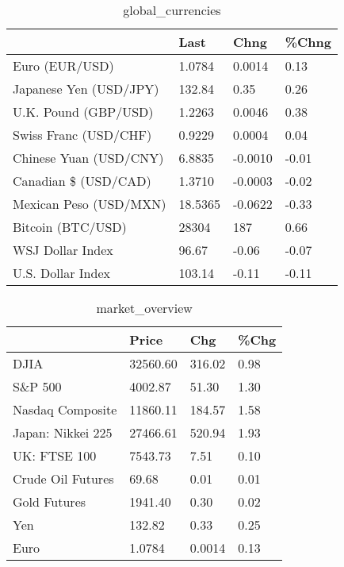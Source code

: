 \documentclass{article}%
\begin{document}
%


\begin{table}[htbp]%
\caption{global\_currencies}%
\centering%
\begin{adjustbox}{width=1\textwidth}%
\begin{tabular}{llll}
\toprule
                       &    Last &    Chng & \%Chng \\
\midrule
        Euro (EUR/USD) &  1.0784 &  0.0014 &  0.13 \\
Japanese Yen (USD/JPY) &  132.84 &    0.35 &  0.26 \\
  U.K. Pound (GBP/USD) &  1.2263 &  0.0046 &  0.38 \\
 Swiss Franc (USD/CHF) &  0.9229 &  0.0004 &  0.04 \\
Chinese Yuan (USD/CNY) &  6.8835 & -0.0010 & -0.01 \\
  Canadian \$ (USD/CAD) &  1.3710 & -0.0003 & -0.02 \\
Mexican Peso (USD/MXN) & 18.5365 & -0.0622 & -0.33 \\
     Bitcoin (BTC/USD) &   28304 &     187 &  0.66 \\
      WSJ Dollar Index &   96.67 &   -0.06 & -0.07 \\
     U.S. Dollar Index &  103.14 &   -0.11 & -0.11 \\
\bottomrule
\end{tabular}
%
\end{adjustbox}%
\end{table}

%


\begin{table}[htbp]%
\caption{market\_overview}%
\centering%
\begin{adjustbox}{width=1\textwidth}%
\begin{tabular}{llll}
\toprule
                  &    Price &    Chg & \%Chg \\
\midrule
             DJIA & 32560.60 & 316.02 & 0.98 \\
          S\&P 500 &  4002.87 &  51.30 & 1.30 \\
 Nasdaq Composite & 11860.11 & 184.57 & 1.58 \\
Japan: Nikkei 225 & 27466.61 & 520.94 & 1.93 \\
     UK: FTSE 100 &  7543.73 &   7.51 & 0.10 \\
Crude Oil Futures &    69.68 &   0.01 & 0.01 \\
     Gold Futures &  1941.40 &   0.30 & 0.02 \\
              Yen &   132.82 &   0.33 & 0.25 \\
             Euro &   1.0784 & 0.0014 & 0.13 \\
\bottomrule
\end{tabular}
%
\end{adjustbox}%
\end{table}

%
\end{document}

